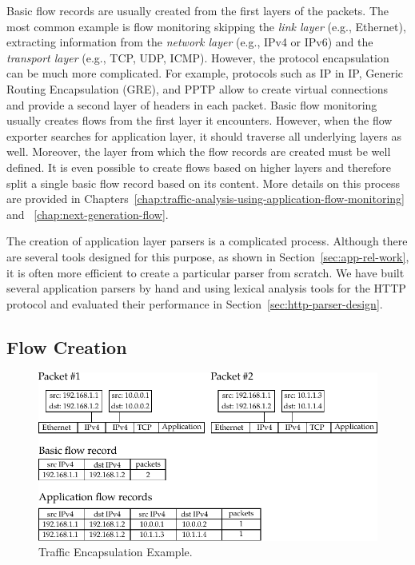 Basic flow records are usually created from the first layers of the packets. The most common example is flow monitoring skipping the \emph{link layer} (e.g., Ethernet), extracting information from the \emph{network layer} (e.g., IPv4 or IPv6) and the \emph{transport layer} (e.g., TCP, UDP, ICMP). However, the protocol encapsulation can be much more complicated. For example, protocols such as IP in IP, Generic Routing Encapsulation (GRE), and PPTP allow to create virtual connections and provide a second layer of headers in each packet. Basic flow monitoring usually creates flows from the first layer it encounters. However, when the flow exporter searches for application layer, it should traverse all underlying layers as well. Moreover, the layer from which the flow records are created must be well defined. It is even possible to create flows based on higher layers and therefore split a single basic flow record based on its content. More details on this process are provided in Chapters~\ref{chap:traffic-analysis-using-application-flow-monitoring} and ~\ref{chap:next-generation-flow}.

The creation of application layer parsers is a complicated process. Although there are several tools designed for this purpose, as shown in Section~\ref{sec:app-rel-work}, it is often more efficient to create a particular parser from scratch. We have built several application parsers by hand and using lexical analysis tools for the HTTP protocol and evaluated their performance in Section~\ref{sec:http-parser-design}.

\subsection{Flow Creation}

\begin{figure}[t!]
  \begin{center}
    \includegraphics{figures/c03/encapsulation}
  \end{center}
  \caption{Traffic Encapsulation Example.}
  \label{fig:encapsulation}
\end{figure}

